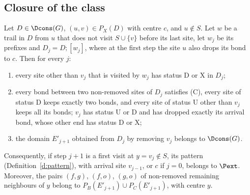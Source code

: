 \subsection{Closure of the class}\label{s:closure}

\begin{lemma}\label{l:closure}
Let $D \in \Dcons(G)$, $(u, v) \in P_X(D)$ with centre $c$, and $u \notin S$. Let $w$ be a trail in $D$ from $u$ that does not visit $S \cup \{v\}$ before its last site, let $w_j$ be its prefixes and $D_j = D;[w_j]$, where at the first step the site $u$ also drops its bond to $c$. Then for every $j$:
\begin{enumerate}
\item every site other than $v_j$ that is visited by $w_j$ has status $\mathrm D$ or $\mathrm X$ in $D_j$;
\item every bond between two non-removed sites of $D_j$ satisfies (C), every site of status $\mathrm D$ keeps exactly two bonds, and every site of status $\mathrm U$ other than $v_j$ keeps all its bonds; $v_j$ has status $\mathrm U$ or $\mathrm D$ and has dropped exactly its arrival bond, whose other end has status $\mathrm D$ or $\mathrm X$;
\item the domain $E'_{j + 1}$ obtained from $D_j$ by removing $v_j$ belongs to $\Dcons(G)$.
\end{enumerate}
Consequently, if step $j + 1$ is a first visit at $y = v_j \notin S$, its pattern (Definition~\ref{d:pattern}), with arrival site $v_{j - 1}$, or $c$ if $j = 0$, belongs to $\Pext$. Moreover, the pairs $(f, g)$, $(f, o)$, $(g, o)$ of non-removed remaining neighbours of $y$ belong to $P_B(E'_{j + 1}) \cup P_C(E'_{j + 1})$, with centre $y$.
\end{lemma}

